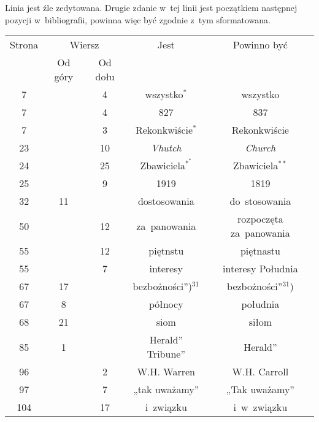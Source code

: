\documentclass[a4paper,11pt]{article}
\numberwithin{equation}{section}
\begin{document}
\noindent
{} Linia jest źle zedytowana. Drugie zdanie w~tej linii
jest początkiem następnej pozycji w~bibliografii, powinna więc być zgodnie
z~tym sformatowana.

\VerSpaceFour





\newpage



\begin{center}

  \begin{tabular}{|c|c|c|c|c|}
    \hline
    Strona & \multicolumn{2}{c|}{Wiersz} & Jest
                              & Powinno być \\ \cline{2-3}
    & Od góry & Od dołu & & \\
    \hline
    \hphantom{00}7 & & \hphantom{0}4 & wszystko$^{ * }$ & wszystko \\
    \hphantom{00}7 & & \hphantom{0}4 & 827 & 837 \\
    \hphantom{00}7 & & \hphantom{0}3 & Rekonkwiście$^{ * }$
    & Rekonkwiście \\
    \hphantom{0}23 & & 10 & \textit{Vhutch} & \textit{Church} \\
    \hphantom{0}24 & & 25 & Zbawiciela$^{ *^{ * } }$ & Zbawiciela$^{ ** }$ \\
    \hphantom{0}25 & & \hphantom{0}9 & 1919 & 1819 \\
    \hphantom{0}32 & 11 & & dostosowania & do~stosowania \\
    \hphantom{0}50 & & 12 & za~panowania & rozpoczęta za~panowania \\
    \hphantom{0}55 & & 12 & piętnstu & piętnastu \\
    \hphantom{0}55 & &  7 & interesy & interesy Południa \\
    \hphantom{0}67 & 17 & & bezbożności”)$^{ 31 }$
    & bezbożności”$^{ 31 }$) \\
    \hphantom{0}67 & \hphantom{0}8 & & północy & południa \\
    \hphantom{0}68 & 21 & & siom & siłom \\
    \hphantom{0}85 & \hphantom{0}1 & & Herald” Tribune” & Herald” \\
    \hphantom{0}96 & & \hphantom{0}2 & W.H. Warren & W.H. Carroll \\
    \hphantom{0}97 & & \hphantom{0}7 & „tak uważamy” & „Tak uważamy” \\
    104 & & 17 & i~związku & i~w~związku \\

\end{tabular}
\end{center}
\end{document}
